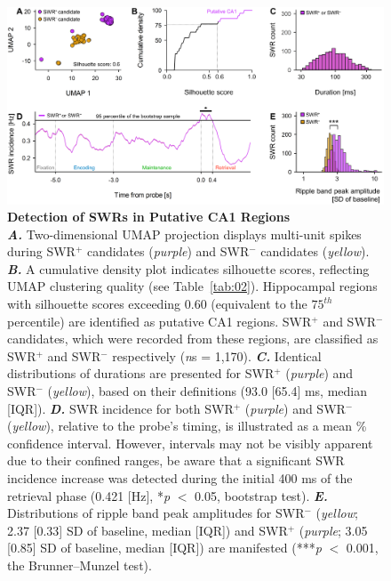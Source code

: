 \documentclass[preprint,review,12pt]{elsarticle}%
\begin{document}
        \begin{figure}[ht]
        	\centering
            \includegraphics[width=1\textwidth]{./src/figures/.png/Figure_ID_04.png}
        	\caption{\textbf{Detection of SWRs in Putative CA1 Regions}\\
\textbf{\textit{A.}} Two-dimensional UMAP \cite{mcinnes_umap_2018} projection displays multi-unit spikes during SWR$^+$ candidates (\textit{purple}) and SWR$^-$ candidates (\textit{yellow}). \textbf{\textit{B.}} A cumulative density plot indicates silhouette scores, reflecting UMAP clustering quality (see Table~\ref{tab:02}). Hippocampal regions with silhouette scores exceeding 0.60 (equivalent to the $75^{th}$ percentile) are identified as putative CA1 regions. SWR$^+$ and SWR$^-$ candidates, which were recorded from these regions, are classified as SWR$^+$ and SWR$^-$ respectively (\textit{n}s = 1,170). \textbf{\textit{C.}} Identical distributions of durations are presented for SWR$^+$ (\textit{purple}) and SWR$^-$ (\textit{yellow}), based on their definitions (93.0 [65.4] ms, median [IQR]). \textbf{\textit{D.}} SWR incidence for both SWR$^+$ (\textit{purple}) and SWR$^-$ (\textit{yellow}), relative to the probe's timing, is illustrated as a mean \% confidence interval. However, intervals may not be visibly apparent due to their confined ranges, be aware that a significant SWR incidence increase was detected during the initial 400 ms of the retrieval phase (0.421 [Hz], *\textit{p} $<$ 0.05, bootstrap test). \textbf{\textit{E.}} Distributions of ripple band peak amplitudes for SWR$^-$ (\textit{yellow}; 2.37 [0.33] SD of baseline, median [IQR]) and SWR$^+$ (\textit{purple}; 3.05 [0.85] SD of baseline, median [IQR]) are manifested (***\textit{p} $<$ 0.001, the Brunner--Munzel test).}
        	\label{fig:04}
        \end{figure}
\end{document}
